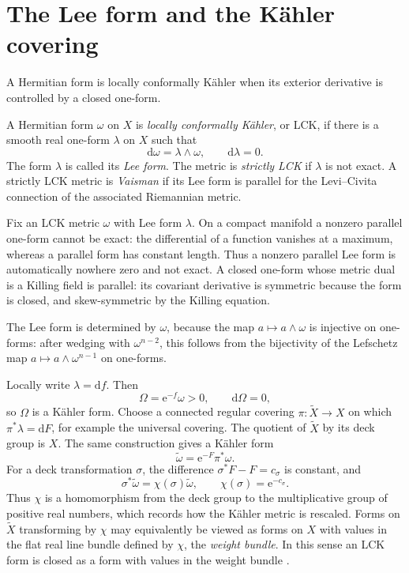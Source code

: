 \section{The Lee form and the K\"ahler covering}\label{sec:lck-lee-cover}

A Hermitian form is locally conformally K\"ahler when its exterior derivative is controlled by a closed one-form.

\begin{definition}\label{def:lck}
A Hermitian form $\omega$ on $X$ is \emph{locally conformally K\"ahler}, or LCK, if there is a smooth real one-form $\lambda$ on $X$ such that
\[
 \mathrm{d}\omega=\lambda\wedge\omega,
 \qquad \mathrm{d}\lambda=0.
\]
The form $\lambda$ is called its \emph{Lee form}. The metric is \emph{strictly LCK} if $\lambda$ is not exact. A strictly LCK metric is \emph{Vaisman} if its Lee form is parallel for the Levi--Civita connection of the associated Riemannian metric.
\end{definition}

Fix an LCK metric $\omega$ with Lee form $\lambda$. On a compact manifold a nonzero parallel one-form cannot be exact: the differential of a function vanishes at a maximum, whereas a parallel form has constant length. Thus a nonzero parallel Lee form is automatically nowhere zero and not exact. A closed one-form whose metric dual is a Killing field is parallel: its covariant derivative is symmetric because the form is closed, and skew-symmetric by the Killing equation.

The Lee form is determined by $\omega$, because the map $a\mapsto a\wedge\omega$ is injective on one-forms: after wedging with $\omega^{n-2}$, this follows from the bijectivity of the Lefschetz map $a\mapsto a\wedge\omega^{n-1}$ on one-forms.

Locally write $\lambda=\mathrm{d}f$. Then
\[
 \Omega=\mathrm{e}^{-f}\omega>0,\qquad \mathrm{d}\Omega=0,
\]
so $\Omega$ is a K\"ahler form. Choose a connected regular covering $\pi\colon \widetilde X\to X$ on which $\pi^*\lambda=\mathrm{d}F$, for example the universal covering. The quotient of $\widetilde X$ by its deck group is $X$. The same construction gives a K\"ahler form
\begin{equation}\label{eq:lck-cover}
 \widetilde\omega=\mathrm{e}^{-F}\pi^*\omega.
\end{equation}
For a deck transformation $\sigma$, the difference $\sigma^*F-F=c_\sigma$ is constant, and
\[
 \sigma^*\widetilde\omega=\chi(\sigma)\widetilde\omega,
 \qquad \chi(\sigma)=\mathrm{e}^{-c_\sigma}.
\]
Thus $\chi$ is a homomorphism from the deck group to the multiplicative group of positive real numbers, which records how the K\"ahler metric is rescaled. Forms on $\widetilde X$ transforming by $\chi$ may equivalently be viewed as forms on $X$ with values in the flat real line bundle defined by $\chi$, the \emph{weight bundle}. In this sense an LCK form is closed as a form with values in the weight bundle \cite[Section 3.4]{OV24LCK}.

